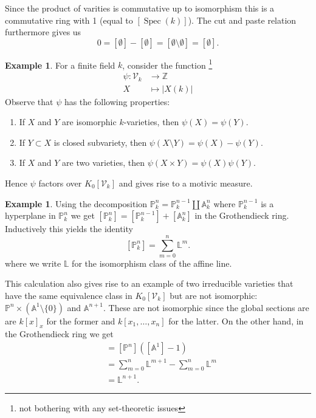\documentclass[11pt, a4paper, german]{article}
\theoremstyle{plain}
\theoremstyle{definition}
\newtheorem{example}[theorem]{Example}
\newcommand{\gring}[1][k]{K_0[\mathcal{V}_#1]}
\DeclareMathOperator{\Spec}{Spec}
\begin{document}
Since the product of varities is commutative up to isomorphism this is a commutative ring with 1 (equal to $[\Spec(k)]$). 
The cut and paste relation furthermore gives us
\[
    0 = [\emptyset] - [\emptyset] = [\emptyset \setminus \emptyset] = [\emptyset].
\]

\begin{example}
    \label{countMeasure}
    For a finite field $k$, consider the function \footnote{not bothering with any set-theoretic issues} 
    \begin{align*}
        \psi \colon \mathcal{V}_k & \to   \mathbb{Z}\\
        X & \mapsto |X(k)|
    \end{align*}
    Observe that $\psi$ has the following properties:
    \begin{enumerate}
        \item If $X$ and $Y$ are isomorphic $k$-varieties, then $\psi(X) = \psi(Y)$.
        \item If $Y \subset X$ is closed subvariety, then $\psi(X \setminus Y) = \psi(X) - \psi(Y)$.
        \item If $X$ and $Y$ are two varieties, then $\psi(X \times Y) = \psi(X)\psi(Y)$.
    \end{enumerate}
    Hence $\psi$ factors over $\gring[k]$ and gives rise to a motivic measure.
\end{example}

\begin{example}
    \label{projSum}
    Using the decomposition $\mathbb{P}_k^n = \mathbb{P}_k^{n-1} \coprod \mathbb{A}_k^n$ where $\mathbb{P}_k^{n-1}$ is a hyperplane
    in $\mathbb{P}_k^n$  we get $[\mathbb{P}_k^n] = [\mathbb{P}_k^{n-1}] + [\mathbb{A}_k^n]$ in the Grothendieck ring.
    Inductively this yields the identity 
    \[
        [\mathbb{P}_k^n] = \sum_{m=0}^n \mathbb{L}^m.
    \]
    where we write $\mathbb{L}$ for the isomorphism class of the affine line.
\end{example}

This calculation also gives rise to an example of two irreducible varieties that have the same equivalence class in $\gring[k]$ but are not
isomorphic: $\mathbb{P}^n \times (\mathbb{A}^1\setminus \{0\})$ and $\mathbb{A}^{n+1}$. These are not isomorphic since the global sections are
are $k[x]_{x}$ for the former and $k[x_1,\dots,x_n]$ for the latter. On the other hand, in the Grothendieck ring we get
\begin{align*}
    [\mathbb{P}^n \times \left (\mathbb{A}^1 \setminus \{0\}\right )] &= [\mathbb{P}^n]\left ([\mathbb{A}^1] - 1\right ) \\
                                                                      &= \sum_{m=0}^n \mathbb{L}^{m+1} - \sum_{m=0}^n \mathbb{L}^m \\
                                                                      &= \mathbb{L}^{n+1}.
\end{align*}
\end{document}
